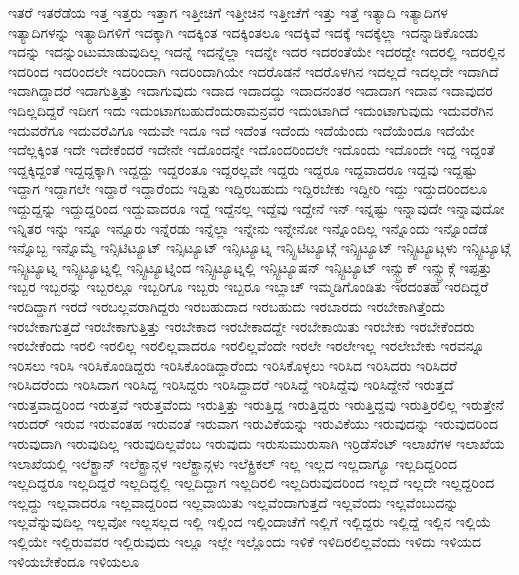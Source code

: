 {ಇತರೆ
ಇತರೆಡೆಯ
ಇತ್ತ
ಇತ್ತರು
ಇತ್ತಾಗ
ಇತ್ತೀಚಿಗೆ
ಇತ್ತೀಚಿನ
ಇತ್ತೀಚೆಗೆ
ಇತ್ತು
ಇತ್ತೆ
ಇತ್ಯಾದಿ
ಇತ್ಯಾದಿಗಳ
ಇತ್ಯಾದಿಗಳನ್ನು
ಇತ್ಯಾದಿಗಳಿಗೆ
ಇದಕ್ಕಾಗಿ
ಇದಕ್ಕಿಂತ
ಇದಕ್ಕಿಂತಲೂ
ಇದಕ್ಕಿವೆ
ಇದಕ್ಕೆ
ಇದಕ್ಕೆಲ್ಲಾ
ಇದನ್ನಾಡಿಕೊಂಡು
ಇದನ್ನು
ಇದನ್ನುಂಟುಮಾಡುವುದಿಲ್ಲ
ಇದನ್ನೆ
ಇದನ್ನೆಲ್ಲಾ
ಇದನ್ನೇ
ಇದರ
ಇದರಂತೆಯೇ
ಇದರದ್ದೇ
ಇದರಲ್ಲಿ
ಇದರಲ್ಲಿನ
ಇದರಿಂದ
ಇದರಿಂದಲೇ
ಇದರಿಂದಾಗಿ
ಇದರಿಂದಾಗಿಯೇ
ಇದರೊಡನೆ
ಇದರೊಳಗಿನ
ಇದಲ್ಲದೆ
ಇದಲ್ಲದೇ
ಇದಾಗಿದೆ
ಇದಾಗಿದ್ದಾದರೆ
ಇದಾಗುತ್ತಿತ್ತು
ಇದಾಗುವುದು
ಇದಾದ
ಇದಾದದ್ದು
ಇದಾದನಂತರ
ಇದಾದಾಗ
ಇದಾವ
ಇದಾವುದರ
ಇದಿಲ್ಲದಿದ್ದರೆ
ಇದೀಗ
ಇದು
ಇದುಂಟಾಗಬಹುದೆಂದುರಾಮನ್ರವರ
ಇದುಂಟಾಗಿದೆ
ಇದುಂಟಾಗುವುದು
ಇದುವರೆಗಿನ
ಇದುವರೆಗೂ
ಇದುವರೆವಿಗೂ
ಇದುವೇ
ಇದೂ
ಇದೆ
ಇದೆಂತ
ಇದೆಂದು
ಇದೆಯೆಂದು
ಇದೆಯೆಂದೂ
ಇದೆಯೇ
ಇದೆಲ್ಲಕ್ಕಿಂತ
ಇದೇ
ಇದೇಕೆಂದರೆ
ಇದೇನೇ
ಇದೊಂದನ್ನೇ
ಇದೊಂದರಿಂದಲೇ
ಇದೊಂದು
ಇದೊಂದೇ
ಇದ್ದ
ಇದ್ದಂತೆ
ಇದ್ದಕ್ಕಿದ್ದಂತೆ
ಇದ್ದದ್ದಕ್ಕಾಗಿ
ಇದ್ದದ್ದು
ಇದ್ದರಂತೂ
ಇದ್ದರಲ್ಲವೇ
ಇದ್ದರು
ಇದ್ದರೂ
ಇದ್ದವಾದರೂ
ಇದ್ದವು
ಇದ್ದಷ್ಟು
ಇದ್ದಾಗ
ಇದ್ದಾಗಲೇ
ಇದ್ದಾರೆ
ಇದ್ದಾರೆಂದು
ಇದ್ದಿತು
ಇದ್ದಿರಬಹುದು
ಇದ್ದಿರಬೇಕು
ಇದ್ದೀರಿ
ಇದ್ದು
ಇದ್ದುದರಿಂದಲೂ
ಇದ್ದುದ್ದನ್ನು
ಇದ್ದುದ್ದರಿಂದ
ಇದ್ದುವಾದರೂ
ಇದ್ದೆ
ಇದ್ದೆನಲ್ಲ
ಇದ್ದೆವು
ಇದ್ದೇನೆ
ಇನ್
ಇನ್ನಷ್ಟು
ಇನ್ನಾವುದೇ
ಇನ್ನಾವುದೋ
ಇನ್ನಿತರ
ಇನ್ನು
ಇನ್ನೂ
ಇನ್ನೂರು
ಇನ್ನೆರಡು
ಇನ್ನೆಲ್ಲಾ
ಇನ್ನೇನು
ಇನ್ನೇನೋ
ಇನ್ನೊಂದಿಲ್ಲ
ಇನ್ನೊಂದು
ಇನ್ನೊಂದೆಡೆ
ಇನ್ನೊಬ್ಬ
ಇನ್ನೊಮ್ಮೆ
ಇನ್ಸಿಟಿಟ್ಯೂಟ್
ಇನ್ಸಿಟ್ಯೂಟ್
ಇನ್ಸಿಟ್ಯೂಟ್ನ
ಇನ್ಸ್ಟಿಟಿಟ್ಯೂಟ್ಗೆ
ಇನ್ಸ್ಟಿಟ್ಯೂಟ್
ಇನ್ಸ್ಟಿಟ್ಯೂಟ್ಗಳು
ಇನ್ಸ್ಟಿಟ್ಯೂಟ್ಗೆ
ಇನ್ಸ್ಟಿಟ್ಯೂಟ್ನ
ಇನ್ಸ್ಟಿಟ್ಯೂಟ್ನಲ್ಲಿ
ಇನ್ಸ್ಟಿಟ್ಯೂಟ್ನಿಂದ
ಇನ್ಸ್ಟಿಟ್ಯೂಟ್ನಲ್ಲಿ
ಇನ್ಸ್ಟಿಟ್ಯೂಷನ್
ಇನ್ಸ್ಟಿಟ್ಯೂಟ್
ಇನ್ಸ್ಬ್ರುಕ್
ಇನ್ಸ್ಬ್ರುಕ್ಗೆ
ಇಪ್ಪತ್ತು
ಇಬ್ಬರ
ಇಬ್ಬರನ್ನು
ಇಬ್ಬರಲ್ಲೂ
ಇಬ್ಬರಿಗೂ
ಇಬ್ಬರು
ಇಬ್ಬರೂ
ಇಬ್ಲಾಚ್
ಇಮ್ಮಡಿಗೊಂಡಿತು
ಇರದಂತಹ
ಇರದಿದ್ದರೆ
ಇರದಿದ್ದಾಗ
ಇರದೆ
ಇರಬಲ್ಲವರಾಗಿದ್ದರು
ಇರಬಹುದಾದ
ಇರಬಹುದು
ಇರಬಾರದು
ಇರಬೇಕಾಗಿತ್ತೆಂದು
ಇರಬೇಕಾಗುತ್ತದೆ
ಇರಬೇಕಾಗುತ್ತಿತ್ತು
ಇರಬೇಕಾದ
ಇರಬೇಕಾದದ್ದೇ
ಇರಬೇಕಾಯಿತು
ಇರಬೇಕು
ಇರಬೇಕೆಂದರು
ಇರಬೇಕೆಂದು
ಇರಲಿ
ಇರಲಿಲ್ಲ
ಇರಲಿಲ್ಲವಾದರೂ
ಇರಲಿಲ್ಲವೆಂದೇ
ಇರಲೇ
ಇರಲೇಇಲ್ಲ
ಇರಲೇಬೇಕು
ಇರವನ್ನೂ
ಇರಿಸಲು
ಇರಿಸಿ
ಇರಿಸಿಕೊಂಡಿದ್ದರು
ಇರಿಸಿಕೊಂಡಿದ್ದಾರೆಂದು
ಇರಿಸಿಕೊಳ್ಳಲು
ಇರಿಸಿದ
ಇರಿಸಿದರು
ಇರಿಸಿದರೆ
ಇರಿಸಿದರೆಂದು
ಇರಿಸಿದಾಗ
ಇರಿಸಿದ್ದ
ಇರಿಸಿದ್ದರು
ಇರಿಸಿದ್ದಾದರೆ
ಇರಿಸಿದ್ದೆ
ಇರಿಸಿದ್ದೆವು
ಇರಿಸಿದ್ದೇನೆ
ಇರುತ್ತದೆ
ಇರುತ್ತವಾದ್ದರಿಂದ
ಇರುತ್ತವೆ
ಇರುತ್ತವೆಂದು
ಇರುತ್ತಿತ್ತು
ಇರುತ್ತಿದ್ದ
ಇರುತ್ತಿದ್ದರು
ಇರುತ್ತಿದ್ದವು
ಇರುತ್ತಿರಲಿಲ್ಲ
ಇರುತ್ತೇನೆ
ಇರುದರ್
ಇರುವ
ಇರುವಂತಹ
ಇರುವಂತೆ
ಇರುವಾಗ
ಇರುವಿಕೆಯನ್ನು
ಇರುವಿಕೆಯು
ಇರುವುದನ್ನು
ಇರುವುದರಿಂದ
ಇರುವುದಾಗಿ
ಇರುವುದಿಲ್ಲ
ಇರುವುದಿಲ್ಲವೆಂಬ
ಇರುವುದು
ಇರುಸುಮುರುಸಾಗಿ
ಇರ್ರಿಡೆಸೆಂಟ್
ಇಲಾಖೆಗಳ
ಇಲಾಖೆಯ
ಇಲಾಖೆಯಲ್ಲಿ
ಇಲೆಕ್ಟ್ರಾನ್
ಇಲೆಕ್ಟ್ರಾನ್ಗಳ
ಇಲೆಕ್ಟ್ರಾನ್ಗಳು
ಇಲೆಕ್ಟ್ರಿಕಲ್
ಇಲ್ಲ
ಇಲ್ಲದ
ಇಲ್ಲದಾಗ್ಯೂ
ಇಲ್ಲದಿದ್ದರಿಂದ
ಇಲ್ಲದಿದ್ದರೂ
ಇಲ್ಲದಿದ್ದರೆ
ಇಲ್ಲದಿದ್ದಲ್ಲಿ
ಇಲ್ಲದಿದ್ದಾಗ
ಇಲ್ಲದಿರಲಿ
ಇಲ್ಲದಿರುವುದರಿಂದ
ಇಲ್ಲದೆ
ಇಲ್ಲದೇ
ಇಲ್ಲದ್ದರಿಂದ
ಇಲ್ಲದ್ದು
ಇಲ್ಲವಾದರೂ
ಇಲ್ಲವಾದ್ದರಿಂದ
ಇಲ್ಲವಾಯಿತು
ಇಲ್ಲವೆಂದಾಗುತ್ತದೆ
ಇಲ್ಲವೆಂದು
ಇಲ್ಲವೆಂಬುದನ್ನು
ಇಲ್ಲವೆನ್ನುವುದಿಲ್ಲ
ಇಲ್ಲವೋ
ಇಲ್ಲಸಲ್ಲದ
ಇಲ್ಲಿ
ಇಲ್ಲಿಂದ
ಇಲ್ಲಿಂದಾಚೆಗೆ
ಇಲ್ಲಿಗೆ
ಇಲ್ಲಿದ್ದರು
ಇಲ್ಲಿದ್ದೆ
ಇಲ್ಲಿನ
ಇಲ್ಲಿಯೆ
ಇಲ್ಲಿಯೇ
ಇಲ್ಲಿರುವವರ
ಇಲ್ಲಿರುವುದು
ಇಲ್ಲೂ
ಇಲ್ಲೇ
ಇಲ್ಲೊಂದು
ಇಳಿಕೆ
ಇಳಿದಿರಲಿಲ್ಲವೆಂದು
ಇಳಿದು
ಇಳಿಯದ
ಇಳಿಯಬೇಕೆಂದೂ
ಇಳಿಯಲೂ
}
